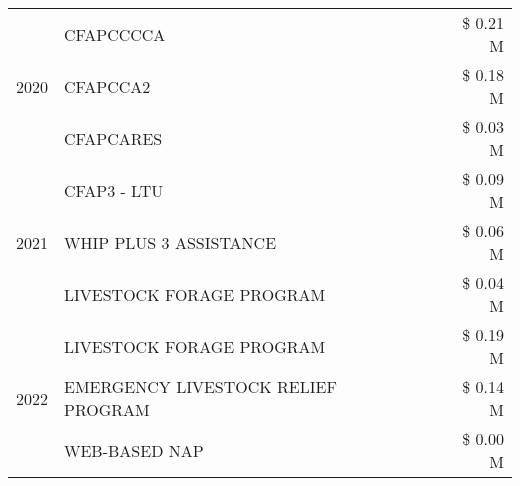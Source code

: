 \begin{tabular}{llr}
\cline{1-3}
\multirow[t]{3}{*}{2020} & CFAPCCCCA & \$ 0.21 M \\
 & CFAPCCA2 & \$ 0.18 M \\
 & CFAPCARES & \$ 0.03 M \\
\cline{1-3}
\multirow[t]{3}{*}{2021} & CFAP3 - LTU & \$ 0.09 M \\
 & WHIP PLUS 3 ASSISTANCE & \$ 0.06 M \\
 & LIVESTOCK FORAGE PROGRAM & \$ 0.04 M \\
\cline{1-3}
\multirow[t]{3}{*}{2022} & LIVESTOCK FORAGE PROGRAM & \$ 0.19 M \\
 & EMERGENCY LIVESTOCK RELIEF PROGRAM & \$ 0.14 M \\
 & WEB-BASED NAP & \$ 0.00 M \\
\cline{1-3}
\bottomrule
\end{tabular}
